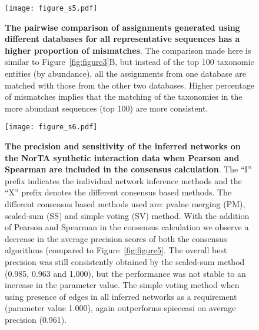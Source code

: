     \begin{figure}[H]
      \centering
      \texttt{[image: figure\_s5.pdf]}
    \end{figure}
    \begin{figure}[H]
      \centering
        \caption{
          \textbf{The pairwise comparison of assignments generated using different databases for all representative sequences has a higher proportion of mismatches}.
          The comparison made here is similar to Figure~\ref{fig:figure3}B, but instead of the top 100 taxonomic entities (by abundance), all the assignments from one database are matched with those from the other two databases.
          Higher percentage of mismatches implies that the matching of the taxonomies in the more abundant sequences (top 100) are more consistent.
        }
      \label{fig:figure_s5}
    \end{figure}
    \FloatBarrier
    \newpage

  \begin{figure}[H]
    \centering
    \texttt{[image: figure\_s6.pdf]}
  \end{figure}
  \begin{figure}[H]
    \centering
      \caption{
        \textbf{The precision and sensitivity of the inferred networks on the NorTA synthetic interaction data when Pearson and Spearman are included in the consensus calculation}.
        The ``I'' prefix indicates the individual network inference methods and the ``X'' prefix denotes the different consensus based methods.
        The different consensus based methods used are: pvalue merging (PM), scaled-sum (SS) and simple voting (SV) method.
        With the addition of Pearson and Spearman in the consensus calculation we observe a decrease in the average precision scores of both the consensus algorithms (compared to Figure~\ref{fig:figure5}.
        The overall best precision was still consistently obtained by the scaled-sum method (0.985, 0.963 and 1.000), but the performance was not stable to an increase in the parameter value.
        The simple voting method when using presence of edges in all inferred networks as a requirement (parameter value 1.000), again outperforms \ac{spieceasi} on average precision (0.961).
      }
    \label{fig:figure_s6}
  \end{figure}
  \FloatBarrier
  \newpage

